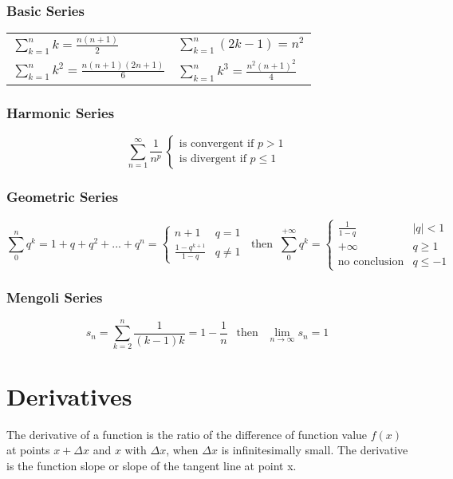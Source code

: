 \subsubsection{Basic Series}

\begin{tabular}{ l l }
$ \displaystyle \sum_{k=1}^n k = \frac{n(n+1)}{2} $ &
$ \displaystyle \sum_{k=1}^n (2k-1) = n^2 $ \\ [1.5em]
$ \displaystyle \sum_{k=1}^n k^2 = \frac{n(n+1)(2n+1)}{6} $ & 
$ \displaystyle \sum_{k=1}^n k^3 = \frac{n^2(n+1)^2}{4} $
\end{tabular}

\subsubsection{Harmonic Series}
\[
\sum_{n=1}^\infty \frac{1}{n^p} ~ \begin{cases}
									\text{is convergent if } p>1 \\
									\text{is divergent if } p\leq1
									\end{cases}
\]

\subsubsection{Geometric Series}
\[
\sum_{0}^{n}q^k=1+q+q^2+...+q^n= \begin{cases}
									n+1 & q=1 \\
									\frac{1-q^{k+1}}{1-q} & q\ne1
								 \end{cases}
~ \text{ then } ~
\sum_{0}^{+\infty}q^k= \begin{cases}
\frac{1}{1-q} & \left|q\right|<1 \\
+\infty & q\ge1 \\
\text{no conclusion} & q\le-1
\end{cases}
\]

\subsubsection{Mengoli Series}
\[
s_n=\sum_{k=2}^{n}\frac{1}{(k-1)k}=1-\frac{1}{n} ~~ \text{ then } ~~  \lim_{n\rightarrow\infty}s_n=1
\]

\section{Derivatives}
The derivative of a function is the ratio of the difference of function value $ f(x) $ at points $ x+\Delta x $ and $ x $ with $ \Delta x $, when $ \Delta x $ is infinitesimally small. The derivative is the function slope or slope of the tangent line at point x.

